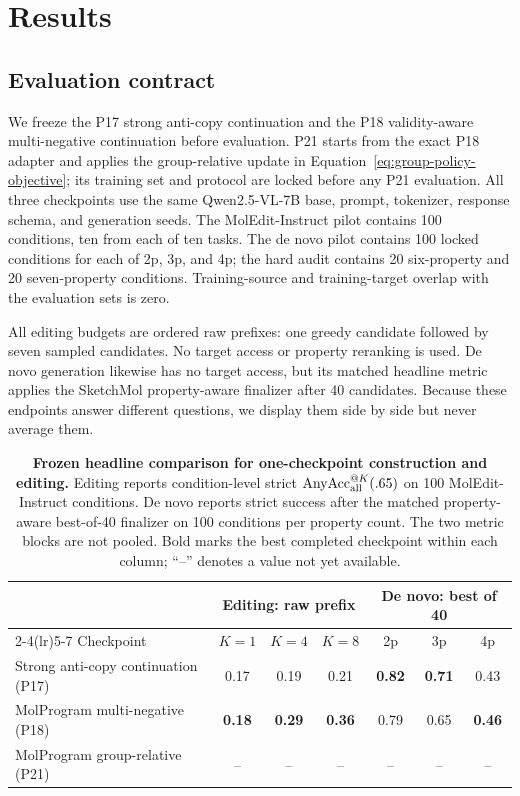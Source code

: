 \section{Results}
\label{sec:results}

\subsection{Evaluation contract}
We freeze the P17 strong anti-copy continuation and the P18 validity-aware
multi-negative continuation before evaluation. P21 starts from the exact P18
adapter and applies the group-relative update in
Equation~\eqref{eq:group-policy-objective}; its training set and protocol are
locked before any P21 evaluation. All three checkpoints use the same
Qwen2.5-VL-7B base, prompt, tokenizer, response schema, and generation seeds.
The MolEdit-Instruct pilot contains 100 conditions, ten from each of ten tasks.
The de novo pilot contains 100 locked conditions for each of 2p, 3p, and 4p;
the hard audit contains 20 six-property and 20 seven-property conditions.
Training-source and training-target overlap with the evaluation sets is zero.

All editing budgets are ordered raw prefixes: one greedy candidate followed by
seven sampled candidates. No target access or property reranking is used.
De novo generation likewise has no target access, but its matched headline
metric applies the SketchMol property-aware finalizer after 40 candidates.
Because these endpoints answer different questions, we display them side by
side but never average them.

\begin{table}[t]
  \centering
  \caption{\textbf{Frozen headline comparison for one-checkpoint construction
  and editing.} Editing reports condition-level strict
  $\operatorname{AnyAcc}_{\rm all}^{@K}(.65)$ on 100 MolEdit-Instruct
  conditions. De novo reports strict success after the matched property-aware
  best-of-40 finalizer on 100 conditions per property count. The two metric
  blocks are not pooled. Bold marks the best completed checkpoint within each
  column; ``--'' denotes a value not yet available.}
  \label{tab:main-unified}
  \small
  \setlength{\tabcolsep}{7pt}
  \begin{tabular}{lcccccc}
    \toprule
    & \multicolumn{3}{c}{Editing: raw prefix}
    & \multicolumn{3}{c}{De novo: best of 40} \\
    \cmidrule(lr){2-4}\cmidrule(lr){5-7}
    Checkpoint & $K=1$ & $K=4$ & $K=8$ & 2p & 3p & 4p \\
    \midrule
    Strong anti-copy continuation (P17)
      & 0.17 & 0.19 & 0.21 & \textbf{0.82} & \textbf{0.71} & 0.43 \\
    MolProgram multi-negative (P18)
      & \textbf{0.18} & \textbf{0.29} & \textbf{0.36}
      & 0.79 & 0.65 & \textbf{0.46} \\
    MolProgram group-relative (P21)
      & -- & -- & -- & -- & -- & -- \\
    \bottomrule
  \end{tabular}
\end{table}

